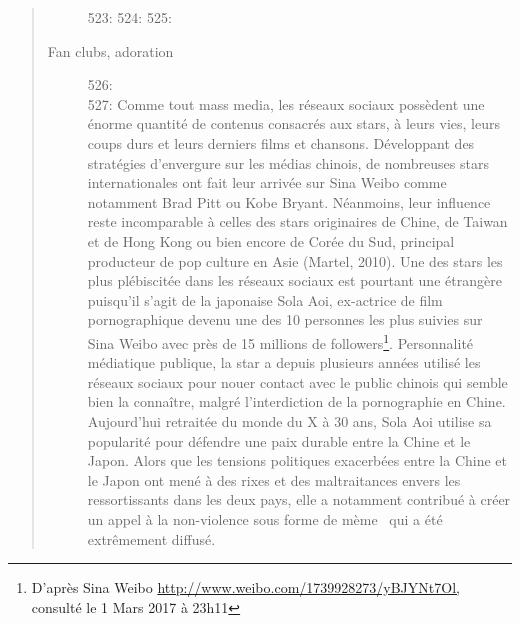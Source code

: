\begin{quote}
\begin{description}
523: 
524: 
525: \item[Fan clubs, adoration]
526: \hfill \\
527: Comme tout mass media, les r\'eseaux sociaux poss\`edent une \'enorme quantit\'e de contenus consacr\'es aux stars, \`a leurs vies, leurs coups durs et leurs derniers films et chansons. D\'eveloppant des strat\'egies d{\textquoteright}envergure sur les m\'edias chinois, de nombreuses stars internationales ont fait leur arriv\'ee sur Sina Weibo comme notamment Brad Pitt ou Kobe Bryant. N\'eanmoins, leur influence reste incomparable \`a celles des stars originaires de Chine, de Taiwan et de Hong Kong ou bien encore de Cor\'ee du Sud, principal producteur de pop culture en Asie (Martel, 2010). Une des stars les plus pl\'ebiscit\'ee dans les r\'eseaux sociaux est pourtant une \'etrang\`ere puisqu{\textquoteright}il s{\textquoteright}agit de la japonaise Sola Aoi, ex-actrice de film pornographique devenu une des 10 personnes les plus suivies sur Sina Weibo avec pr\`es de 15 millions de followers\footnote{ D{\textquoteright}apr\`es Sina Weibo \url{http://www.weibo.com/1739928273/yBJYNt7Ol,} consult\'e le 1 Mars 2017 \`a 23h11}. Personnalit\'e m\'ediatique publique, la star a depuis plusieurs ann\'ees utilis\'e les r\'eseaux sociaux pour nouer contact avec le public chinois qui semble bien la conna\^itre, malgr\'e l{\textquoteright}interdiction de la pornographie en Chine. Aujourd{\textquoteright}hui retrait\'ee du monde du X \`a 30 ans, Sola Aoi utilise sa popularit\'e pour d\'efendre une paix durable entre la Chine et le Japon. Alors que les tensions politiques exacerb\'ees entre la Chine et le Japon ont men\'e \`a des rixes et des maltraitances envers les ressortissants dans les deux pays, elle a notamment contribu\'e \`a cr\'eer un appel \`a la non-violence sous forme de m\`eme \ qui a \'et\'e extr\^emement diffus\'e.  

\end{description}
\end{quote}
